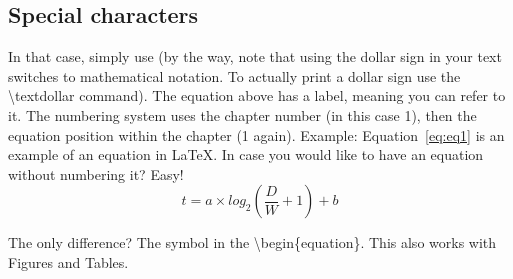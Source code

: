 \subsection{Special characters}
In that case, simply use \textdollar{} (by the way, note that using the dollar sign in your text switches to mathematical notation. To actually print a dollar sign use the \textbackslash{}textdollar command).
The equation above has a label, meaning you can refer to it. The numbering system uses the chapter number (in this case 1), then the equation position within the chapter (1 again).
Example: Equation~\ref{eq:eq1} is an example of an equation in LaTeX{}.
In case you would like to have an equation without numbering it? Easy!
\begin{equation*}
t = a \times log_{2}(\frac{D}{W} + 1) + b
\end{equation*}

The only difference? The \textasteriskcentered{}  symbol in the \textbackslash{}begin\{equation\textbf{\textasteriskcentered}\}.
This also works with Figures and Tables.


